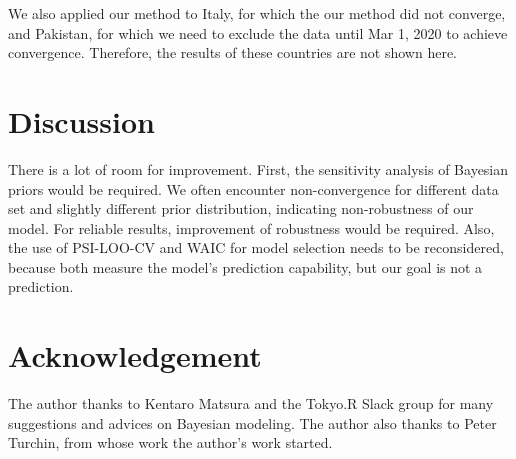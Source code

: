 \documentclass{amsart}
\begin{document}
We also applied our method to Italy, for which the our method did not converge, and Pakistan, for which we need to exclude the data until Mar 1, 2020 to achieve convergence.
Therefore, the results of these countries are not shown here.
   
\section{Discussion}

There is a lot of room for improvement.
First, the sensitivity analysis of Bayesian priors would be required.
We often encounter non-convergence for different data set and slightly different prior distribution, indicating non-robustness of our model.
For reliable results, improvement of robustness would be required.
Also, the use of PSI-LOO-CV and WAIC for model selection needs to be reconsidered, because both measure the model's prediction capability, but our goal is not a prediction.

\section*{Acknowledgement}

The author thanks to Kentaro Matsura and the Tokyo.R Slack group for many suggestions and advices on Bayesian modeling.
The author also thanks to Peter Turchin, from whose work the author's work started.



\end{document}
